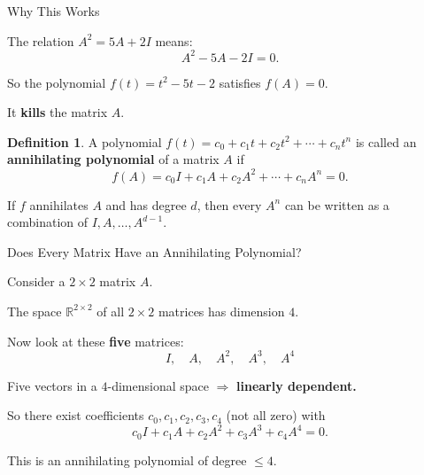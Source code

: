 \documentclass[10pt]{beamer}
\theoremstyle{definition}
\newtheorem{defi}{Definition}[section]
\newcommand{\x}[1]{\alert{\textbf{#1}}}
\begin{document}
\begin{frame}{Why This Works}

The relation $A^2 = 5A + 2I$ means:
$$A^2 - 5A - 2I = 0.$$

\vfill

So the polynomial $f(t) = t^2 - 5t - 2$ satisfies $f(A) = 0$.

It \x{kills} the matrix $A$.

\vfill

\begin{defi}
A polynomial $f(t) = c_0 + c_1 t + c_2 t^2 + \cdots + c_n t^n$ is called an \x{annihilating polynomial} of a matrix $A$ if
$$f(A) = c_0 I + c_1 A + c_2 A^2 + \cdots + c_n A^n = 0.$$
\end{defi}

\vfill

If $f$ annihilates $A$ and has degree $d$, then every $A^n$ can be written
as a combination of $I, A, \ldots, A^{d-1}$.

\vfill
\end{frame}


\begin{frame}{Does Every Matrix Have an Annihilating Polynomial?}

Consider a $2 \times 2$ matrix $A$.

\vfill

The space $\mathbb{R}^{2 \times 2}$ of all $2 \times 2$ matrices has dimension \x{$4$}.

\vfill

Now look at these \x{five} matrices:
$$I, \quad A, \quad A^2, \quad A^3, \quad A^4$$

\vfill

Five vectors in a $4$-dimensional space $\Longrightarrow$ \x{linearly dependent.}

\vfill

So there exist coefficients $c_0, c_1, c_2, c_3, c_4$ (not all zero) with
$$c_0 I + c_1 A + c_2 A^2 + c_3 A^3 + c_4 A^4 = 0.$$

\vfill

This is an annihilating polynomial of degree $\leq 4$.

\vfill
\end{frame}
\end{document}
